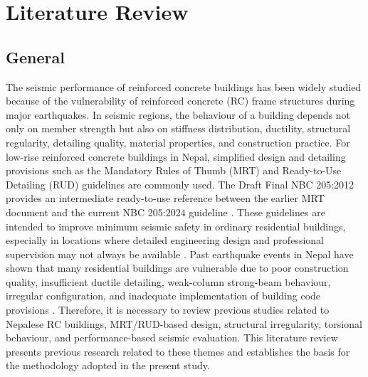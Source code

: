 \chapter[LITERATURE REVIEW]{Literature Review}
\section{General}
The seismic performance of reinforced concrete buildings has been widely studied because of the vulnerability of reinforced concrete (RC) frame structures during major earthquakes. In seismic regions, the behaviour of a building depends not only on member strength but also on stiffness distribution, ductility, structural regularity, detailing quality, material properties, and construction practice. For low-rise reinforced concrete buildings in Nepal, simplified design and detailing provisions such as the Mandatory Rules of Thumb (MRT) and Ready-to-Use Detailing (RUD) guidelines are commonly used. The Draft Final NBC 205:2012 provides an intermediate ready-to-use reference between the earlier MRT document and the current NBC 205:2024 guideline \cite{nbc205_2012}. These guidelines are intended to improve minimum seismic safety in ordinary residential buildings, especially in locations where detailed engineering design and professional supervision may not always be available \cite{nbc205_1994,nbc205_2024}.
Past earthquake events in Nepal have shown that many residential buildings are vulnerable due to poor construction quality, insufficient ductile detailing, weak-column strong-beam behaviour, irregular configuration, and inadequate implementation of building code provisions \cite{chaulagain2013seismic,parajuli2015gorkha}. Therefore, it is necessary to review previous studies related to Nepalese RC buildings, MRT/RUD-based design, structural irregularity, torsional behaviour, and performance-based seismic evaluation. This literature review presents previous research related to these themes and establishes the basis for the methodology adopted in the present study.
